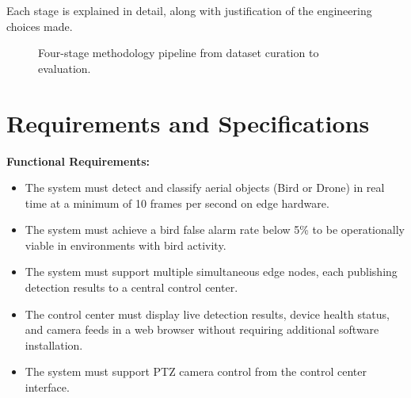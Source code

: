 \documentclass[12pt,a4paper]{report}
\begin{document}
Each stage is explained in detail, along with justification of the
engineering choices made.

\begin{figure}[H]
\centering
{}
\caption[Methodology pipeline]{Four-stage methodology pipeline from dataset curation to evaluation.}
\label{fig:methodology_pipeline}
\end{figure}

\section{Requirements and Specifications}

\textbf{Functional Requirements:}
\begin{itemize}
  \item The system must detect and classify aerial objects (Bird or Drone)
        in real time at a minimum of 10 frames per second on edge hardware.
  \item The system must achieve a bird false alarm rate below 5\% to be
        operationally viable in environments with bird activity.
  \item The system must support multiple simultaneous edge nodes, each
        publishing detection results to a central control center.
  \item The control center must display live detection results, device
        health status, and camera feeds in a web browser without requiring
        additional software installation.
  \item The system must support PTZ camera control from the control center
        interface.
\end{itemize}
\end{document}
